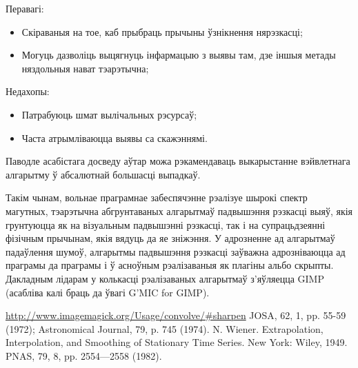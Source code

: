 \documentclass[10pt, a5paper]{article}
\begin{document}
Перавагі:

\begin{itemize}
  \item Скіраваныя на тое, каб прыбраць прычыны ўзнікнення нярэзкасці;
  \item Могуць дазволіць выцягнуць інфармацыю з выявы там, дзе іншыя метады няздольныя нават тэарэтычна;
\end{itemize}

Недахопы:

\begin{itemize}
  \item Патрабуюць шмат вылічальных рэсурсаў;
  \item Часта атрымліваюцца выявы са скажэннямі.
\end{itemize}

Паводле асабістага досведу аўтар можа рэкамендаваць выкарыстанне вэйвлетнага алгарытму ў абсалютнай большасці выпадкаў.

Такім чынам, вольнае праграмнае забеспячэнне рэалізуе шырокі спектр магутных, тэарэтычна абгрунтаваных алгарытмаў падвышэння рэзкасці выяў, якія грунтуюцца як на візуальным падвышэнні рэзкасці, так і на супрацьдзеянні фізічным прычынам, якія вядуць да яе зніжэння. У адрозненне ад алгарытмаў падаўлення шумоў, алгарытмы падвышэння рэзкасці заўважна адрозніваюцца ад праграмы да праграмы і ў асноўным рэалізаваныя як плагіны альбо скрыпты. Дакладным лідарам у колькасці рэалізаваных алгарытмаў з’яўляецца {GIMP} (асабліва калі браць да ўвагі {G'MIC} for {GIMP}).

\begin{thebibliography}{9}
 \url{http://www.imagemagick.org/Usage/convolve/#sharpen}
 JOSA, 62, 1, pp. 55-59 (1972); Astronomical Journal, 79, p. 745 (1974).
 N. Wiener. Extrapolation, Interpolation, and Smoothing of Stationary Time Series. New York: Wiley, 1949.
 PNAS, 79, 8, pp. 2554—2558 (1982).
\end{thebibliography}
\end{document}
